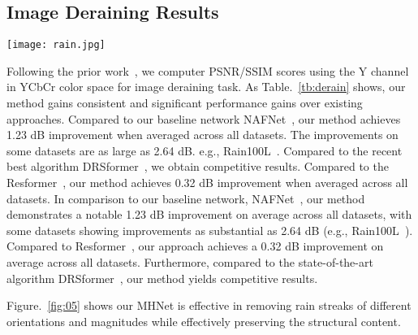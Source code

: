 \documentclass[lettersize,journal]{IEEEtran}
\begin{document}
\subsection{Image Deraining Results}
\begin{figure*}[!htb] \centerline{\texttt{[image: rain.jpg]}}
	\caption{\textbf{Image deraining} example. The outputs of the MHNet exhibit
no traces of rain streaks on both image sample. MHNet also recovers the most detailed images.}
	\label{fig:05}
\end{figure*}
Following the prior work~\cite{Zamir2021MPRNet,MSPFN,SPAIR}, we computer PSNR/SSIM scores using the Y channel in YCbCr color space for image deraining task. As Table.~\ref{tb:derain} shows, our method gains  consistent and significant performance gains over existing approaches. 
Compared to our baseline network NAFNet~\cite{chen2022simple}, our method achieves 1.23 dB improvement when averaged across all datasets. The improvements on some datasets are as large as 2.64 dB. e.g., Rain100L~\cite{Rain100}. Compared to the recent best algorithm DRSformer~\cite{DRSformer}, we obtain competitive results.  Compared to the Resformer~\cite{Zamir2021Restormer},  our method achieves 0.32 dB improvement when averaged across all datasets.
In comparison to our baseline network, NAFNet~\cite{chen2022simple}, our method demonstrates a notable 1.23 dB improvement on average across all datasets, with some datasets showing improvements as substantial as 2.64 dB (e.g., Rain100L~\cite{Rain100}). Compared to Resformer~\cite{Zamir2021Restormer}, our approach achieves a 0.32 dB improvement on average across all datasets. Furthermore, compared to the state-of-the-art algorithm DRSformer~\cite{DRSformer}, our method yields competitive results. 


Figure.~\ref{fig:05} shows our MHNet is effective in removing rain streaks of different orientations and magnitudes while effectively preserving the structural content. 
\end{document}
